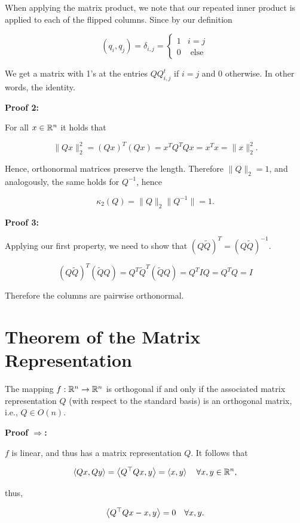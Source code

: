 When applying the matrix product, we note that our repeated inner product is applied to each of the 
flipped columns. Since by our definition 

\[
    (q_i, q_j) = \delta_{i,j} = 
    \begin{cases}
        1 & i = j \\ 
        0 & \text{ else }
    \end{cases}
\]

We get a matrix with 1's at the entries \(QQ^t_{i,j}\) if \(i = j\) and 0 otherwise. In other words, the identity.

\QED

\textbf{Proof 2:}

For all \(x \in \mathbb{R}^n\) it holds that 

\[
    \|Qx\|_2^2 = (Qx)^T(Qx) = x^T Q^T Q x = x^T x = \|x\|_2^2.
\]

Hence, orthonormal matrices preserve the length. Therefore \(\|Q\|_2 = 1\), and 
analogously, the same holds for \(Q^{-1}\), hence 

\[
    \kappa_2(Q) = \|Q\|_2 \|Q^{-1}\| = 1.
\]

\QED

\textbf{Proof 3:}

Applying our first property, we need to show that \((Q\tilde{Q})^T = (Q\tilde{Q})^{-1}\).

\[
    (Q\tilde{Q})^T(\tilde{Q}Q) = Q^T \tilde{Q}^T (\tilde{Q}Q) = Q^T I Q = Q^T Q = I
\]

Therefore the columns are pairwise orthonormal.

\QED

\section{Theorem of the Matrix Representation}

The mapping \( f : \mathbb{R}^n \to \mathbb{R}^n \) is orthogonal if and only if  the associated matrix representation \( Q \) (with respect to the standard basis) 
is an orthogonal matrix, i.e., \( Q \in O(n) \).

\textbf{Proof \(\Rightarrow\):} 

\(f\) is linear, and thus has a matrix representation \( Q \). It follows that

\[
    \left\langle Qx, Qy\right\rangle = \left\langle Q^\top Qx, y\right\rangle = \left\langle x, y\right\rangle \quad \forall x, y 
    \in \mathbb{R}^n,
\]

thus,

\[
    \left\langle Q^\top Qx - x, y\right\rangle = 0 \quad \forall x, y.
\]

